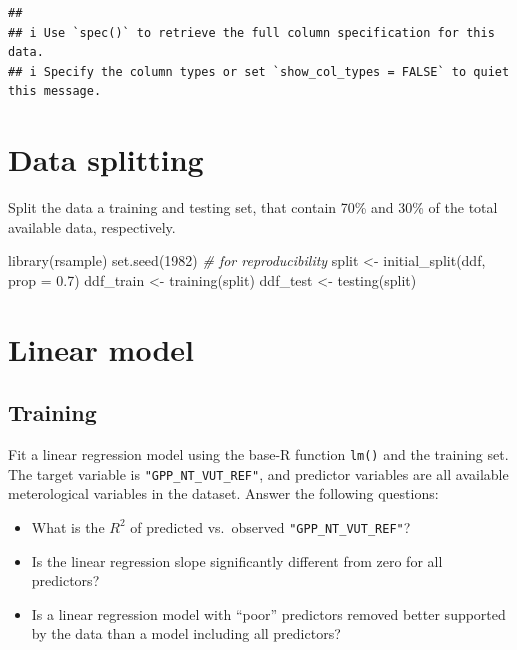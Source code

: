 \documentclass[
]{book}
\newenvironment{Shaded}{\begin{snugshade}}{\end{snugshade}}
\newcommand{\AttributeTok}[1]{\textcolor[rgb]{0.77,0.63,0.00}{#1}}
\newcommand{\CommentTok}[1]{\textcolor[rgb]{0.56,0.35,0.01}{\textit{#1}}}
\newcommand{\DecValTok}[1]{\textcolor[rgb]{0.00,0.00,0.81}{#1}}
\newcommand{\FloatTok}[1]{\textcolor[rgb]{0.00,0.00,0.81}{#1}}
\newcommand{\FunctionTok}[1]{\textcolor[rgb]{0.00,0.00,0.00}{#1}}
\newcommand{\NormalTok}[1]{#1}
\newcommand{\OtherTok}[1]{\textcolor[rgb]{0.56,0.35,0.01}{#1}}
\providecommand{\tightlist}{%
  \setlength{\itemsep}{0pt}\setlength{\parskip}{0pt}}
\begin{document}
\begin{verbatim}
## 
## i Use `spec()` to retrieve the full column specification for this data.
## i Specify the column types or set `show_col_types = FALSE` to quiet this message.
\end{verbatim}

\hypertarget{data-splitting-2}{%
\section{Data splitting}\label{data-splitting-2}}

Split the data a training and testing set, that contain 70\% and 30\% of the total available data, respectively.

\begin{Shaded}
\begin{Highlighting}[]
\FunctionTok{library}\NormalTok{(rsample)}
\FunctionTok{set.seed}\NormalTok{(}\DecValTok{1982}\NormalTok{)  }\CommentTok{\# for reproducibility}
\NormalTok{split }\OtherTok{\textless{}{-}} \FunctionTok{initial\_split}\NormalTok{(ddf, }\AttributeTok{prop =} \FloatTok{0.7}\NormalTok{)}
\NormalTok{ddf\_train }\OtherTok{\textless{}{-}} \FunctionTok{training}\NormalTok{(split)}
\NormalTok{ddf\_test }\OtherTok{\textless{}{-}} \FunctionTok{testing}\NormalTok{(split)}
\end{Highlighting}
\end{Shaded}

\hypertarget{linear-model-1}{%
\section{Linear model}\label{linear-model-1}}

\hypertarget{training-4}{%
\subsection{Training}\label{training-4}}

Fit a linear regression model using the base-R function \texttt{lm()} and the training set. The target variable is \texttt{"GPP\_NT\_VUT\_REF"}, and predictor variables are all available meterological variables in the dataset. Answer the following questions:

\begin{itemize}
\tightlist
\item
  What is the \(R^2\) of predicted vs.~observed \texttt{"GPP\_NT\_VUT\_REF"}?
\item
  Is the linear regression slope significantly different from zero for all predictors?
\item
  Is a linear regression model with ``poor'' predictors removed better supported by the data than a model including all predictors?
\end{itemize}
\end{document}
